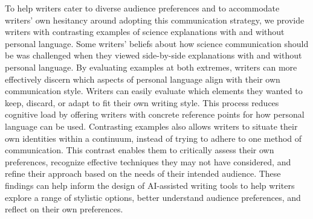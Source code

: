 To help writers cater to diverse audience preferences and to accommodate writers' own hesitancy around adopting this communication strategy, we provide writers with contrasting examples of science explanations with and without personal language. Some writers' beliefs about how science communication should be was challenged when they viewed side-by-side explanations with and without personal language. By evaluating examples at both extremes, writers can more effectively discern which aspects of personal language align with their own communication style. Writers can easily evaluate which elements they wanted to keep, discard, or adapt to fit their own writing style. This process reduces cognitive load by offering writers with concrete reference points for how personal language can be used. Contrasting examples also allows writers to situate their own identities within a continuum, instead of trying to adhere to one method of communication. This contrast enables them to critically assess their own preferences, recognize effective techniques they may not have considered, and refine their approach based on the needs of their intended audience. These findings can help inform the design of AI-assisted writing tools to help writers explore a range of stylistic options, better understand audience preferences, and reflect on their own preferences.












